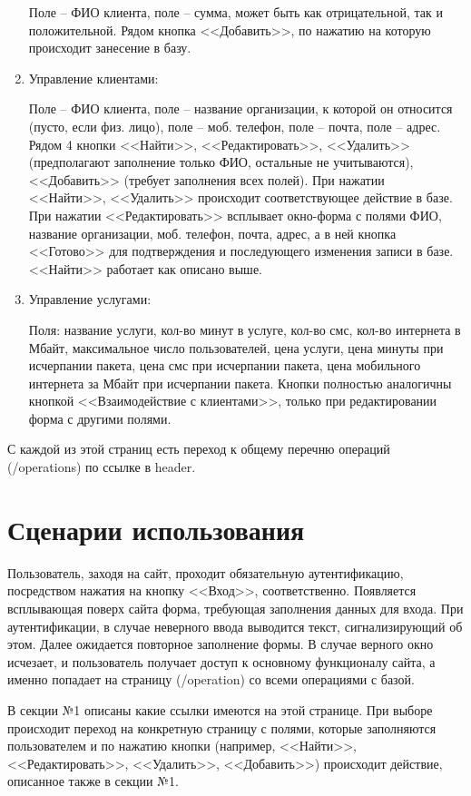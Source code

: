 \documentclass[oneside,senior,etd]{BYUPhysForDegree}
\begin{document}
\begin{enumerate}
    Поле -- ФИО клиента, поле -- сумма, может быть как отрицательной, так и положительной. Рядом кнопка <<Добавить>>, по нажатию на которую происходит занесение в базу.
    \item Управление клиентами:
    
    Поле -- ФИО клиента, поле -- название организации, к которой он относится (пусто, если физ. лицо), поле -- моб. телефон, поле -- почта, поле -- адрес. Рядом 4 кнопки <<Найти>>, <<Редактировать>>, <<Удалить>> (предполагают заполнение только ФИО, остальные не учитываются), <<Добавить>> (требует заполнения всех полей). При нажатии <<Найти>>, <<Удалить>> происходит соответствующее действие в базе. При нажатии <<Редактировать>> всплывает окно-форма с полями ФИО, название организации, моб. телефон, почта, адрес, а в ней кнопка <<Готово>> для подтверждения и последующего изменения записи в базе. <<Найти>> работает как описано выше.
    \item Управление услугами:
    
    Поля: название услуги, кол-во минут в услуге, кол-во смс, кол-во интернета в Мбайт, максимальное число пользователей, цена услуги, цена минуты при исчерпании пакета, цена смс при исчерпании пакета, цена мобильного интернета за Мбайт при исчерпании пакета. Кнопки полностью аналогичны кнопкой <<Взаимодействие с клиентами>>, только при редактировании форма с другими полями.
\end{enumerate}

С каждой из этой страниц есть переход к общему перечню операций (/operations) по ссылке в header.

\newpage
\section{Сценарии использования}

Пользователь, заходя на сайт, проходит обязательную аутентификацию, посредством нажатия на кнопку <<Вход>>, соответственно. Появляется всплывающая поверх сайта форма, требующая заполнения данных для входа. При аутентификации, в случае неверного ввода выводится текст, сигнализирующий об этом. Далее ожидается повторное заполнение формы. В случае верного окно исчезает, и пользователь получает доступ к основному функционалу сайта, а именно попадает на страницу (/operation) со всеми операциями с базой.

В секции №1 описаны какие ссылки имеются на этой странице. При выборе происходит переход на конкретную страницу с полями, которые заполняются пользователем и по нажатию кнопки (например, <<Найти>>, <<Редактировать>>, <<Удалить>>, <<Добавить>>) происходит действие, описанное также в секции №1.
\end{document}
